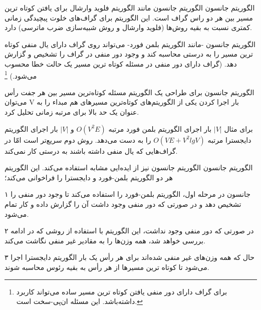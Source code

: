 \begin{itemframe}{الگوریتم جانسون}
\itm
الگوریتم جانسون
مانند الگوریتم فلوید وارشال برای یافتن کوتاه ترین مسیر بین هر دو راس گراف است. این الگوریتم برای گراف‌های خلوت پبچیدگی زمانی کمتری نسبت به بقیه روش‌ها (فلوید وارشال و روش شبیه‌سازی ضرب ماترسی) دارد.

\itm
الگوریتم جانسون -مانند الگوریتم بلمن فورد- می‌تواند روی گراف دارای یال منفی کوتاه ترین مسیر را به درستی محاسبه کند و وجود دور منفی در گراف را تشخیص و گزارش دهد. (گراف دارای دور منفی در مسئله کوتاه ترین مسیر یک حالت خطا محسوب می‌شود.)
\footnote{برای گراف دارای دور منفی یافتن کوتاه ترین مسیر ساده می‌تواند کاربرد داشته‌باشد. این مسئله ان‌پی-سخت است.}
\end{itemframe}

\begin{itemframe}{الگوریتم جانسون}
\itm
برای طراحی یک الگوریتم مسئله کوتاه‌ترین مسیر بین هر جفت رأس می‌توان V بار اجرا کردن یکی از الگوریتم‌های کوتاه‌ترین مسیرهای هم مبداء را به عنوان یک حد بالا برای مرتبه زمانی تحلیل کرد.

\itm
برای مثال
$|V|$
بار اجرای الگوریتم بلمن فورد مرتبه
$O(V^2E)$
و
$|V|$
بار اجرای الگوریتم دایجسترا مرتبه
$O(VE+V^2lgV)$
را به دست می‌دهد.
\itm
روش دوم سریع‌تر است امّا در گراف‌‌هایی که یال منفی داشته باشند به درستی کار نمی‌کند.
\end{itemframe}

\begin{itemframe}{الگوریتم جانسون}
\itm
الگوریتم جانسون نیز از ایده‌ایی مشابه استفاده می‌کند. این الگوریتم هر دو الگوریتم بلمن-فورد و دایجسترا را فراخوانی می‌کند؛
\item[۱]
جانسون در مرحله اول، الگوریتم بلمن-فورد را استفاده می‌کند تا وجود دور منفی را تشخیص دهد و در صورتی که دور منفی وجود داشت آن را گزارش داده و کار تمام می‌شود.
\item[۲]
در صورتی که دور منفی وجود نداشت، این الگوریتم با استفاده از روشی که در ادامه بررسی خواهد شد، همه وزن‌ها را به مقادیر غیر منفی نگاشت می‌کند.
\item[۳]
حال که همه وزن‌‌های غیر منفی شده‌اند برای هر رأس یک بار الگوریتم دایجسترا اجرا می‌شود تا کوتاه ترین مسیرها از هر رأس به بقیه رئوس محاسبه شوند.
\end{itemframe}

